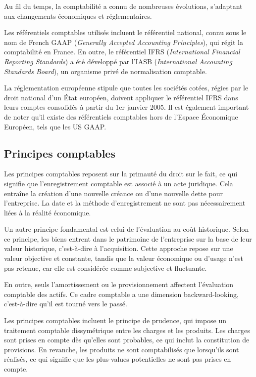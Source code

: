 \documentclass[a4paper, 12pt]{report}
\begin{document}
Au fil du temps, la comptabilité a connu de nombreuses évolutions, s'adaptant aux changements économiques et réglementaires.

Les référentiels comptables utilisés incluent le référentiel national, connu sous le nom de French GAAP (\textit{Generally Accepted Accounting Principles}), qui régit la comptabilité en France. En outre, le référentiel IFRS (\textit{International Financial Reporting Standards}) a été développé par l'IASB (\textit{International Accounting Standards Board}), un organisme privé de normalisation comptable.

La réglementation européenne stipule que toutes les sociétés cotées, régies par le droit national d'un État européen, doivent appliquer le référentiel IFRS dans leurs comptes consolidés à partir du 1er janvier 2005. Il est également important de noter qu'il existe des référentiels comptables hors de l'Espace Économique Européen, tels que les US GAAP.

\subsection{Principes comptables}

Les principes comptables reposent sur la primauté du droit sur le fait, ce qui signifie que l'enregistrement comptable est associé à un acte juridique. Cela entraîne la création d'une nouvelle créance ou d'une nouvelle dette pour l'entreprise. La date et la méthode d'enregistrement ne sont pas nécessairement liées à la réalité économique.

Un autre principe fondamental est celui de l'évaluation au coût historique. Selon ce principe, les biens entrent dans le patrimoine de l'entreprise sur la base de leur valeur historique, c'est-à-dire à l'acquisition. Cette approche repose sur une valeur objective et constante, tandis que la valeur économique ou d'usage n'est pas retenue, car elle est considérée comme subjective et fluctuante.

En outre, seuls l'amortissement ou le provisionnement affectent l'évaluation comptable des actifs. Ce cadre comptable a une dimension backward-looking, c'est-à-dire qu'il est tourné vers le passé.

Les principes comptables incluent le principe de prudence, qui impose un traitement comptable dissymétrique entre les charges et les produits. Les charges sont prises en compte dès qu'elles sont probables, ce qui inclut la constitution de provisions. En revanche, les produits ne sont comptabilisés que lorsqu'ils sont réalisés, ce qui signifie que les plus-values potentielles ne sont pas prises en compte.
\end{document}
